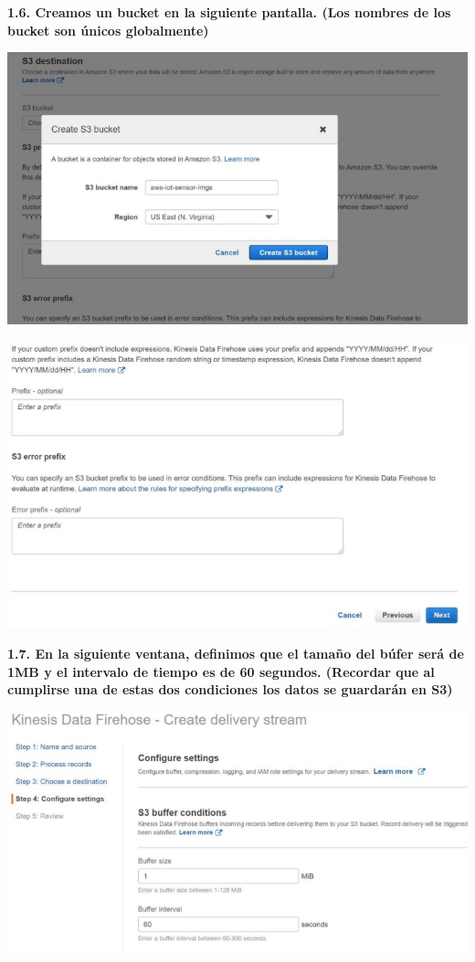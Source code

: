 \documentclass{article}
\begin{document}
	\newpage
\textbf{1.6.  Creamos un bucket en la siguiente pantalla. (Los nombres de los bucket son únicos globalmente)
}

    \begin{center}
		\includegraphics[width=15cm]{./images/5} 
	\end{center}
	 \begin{center}
		\includegraphics[width=15cm]{./images/6} 
	\end{center}
	
	\newpage
\textbf{1.7.  En la siguiente ventana, definimos que el tamaño del búfer será de 1MB y el intervalo de tiempo es de 60
segundos. (Recordar que al cumplirse una de estas dos condiciones los datos se guardarán en S3)
}

    \begin{center}
		\includegraphics[width=15cm]{./images/7} 
	\end{center}
	
\end{document}

